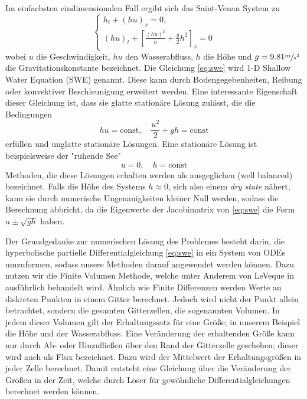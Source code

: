 Im einfachsten eindimensionalen Fall ergibt sich das Saint-Venan System zu 
\begin{equation}
\begin{cases}
 h_t + (hu)_x = 0,\\
 (hu)_t + \left[\frac{(hu)^2}{h} + \frac{g}{2}h^2\right]_x = 0
\end{cases} 
\label{eq:swe}
\end{equation}
wobei $u$ die Geschwindigkeit, $hu$ den Wasserabfluss, $h$ die Höhe und $g=9.81 \sfrac{m}{s^2}$ die Gravitationskonstante bezeichnet.
Die Gleichung \eqref{eq:swe} wird 1-D Shallow Water Equation (SWE) genannt.
Diese kann durch Bodengegebenheiten, Reibung oder konvektiver Beschleunigung erweitert werden.
Eine interessante Eigenschaft dieser Gleichung ist, dass sie glatte stationäre Lösung zulässt, die die Bedingungen
\[
 hu = \text{const}, \quad \frac{u^2}{2}+gh = \text{const}
\]
erfüllen und unglatte stationäre Lösungen. Eine stationäre Lösung ist beispielsweise der "ruhende See"
\[
 u=0, \quad h=\text{const}
\]
Methoden, die diese Lösungen erhalten werden als ausgeglichen (well balanced) bezeichnet. Falls die Höhe des Systems $h \approx 0 $, sich also einem \textit{dry state} nähert, kann sie durch numerische Ungenauigkeiten kleiner Null werden, sodass die Berechnung abbricht, da die Eigenwerte der Jacobimatrix von \eqref{eq:swe} die Form $u\pm \sqrt{gh}$ haben.

Der Grundgedanke zur numerischen Lösung des Problemes besteht darin, die hyperbolische partielle Differentialgleichung \eqref{eq:swe} in ein System von ODEs umzuformen, sodass unsere Methoden darauf angewendet werden können.
Dazu nutzen wir die Finite Volumen Methode, welche unter Anderem von LeVeque in \cite[Abschnitt 4.]{leveque2002finite} ausführlich behandelt wird. Ähnlich wie Finite Differenzen werden Werte an diskreten Punkten in einem Gitter berechnet. Jedoch wird nicht der Punkt allein betrachtet, sondern die gesamten Gitterzellen, die sogenannten Volumen. In jedem dieser Volumen gilt der Erhaltungssatz für eine Größe; in unserem Beispiel die Höhe und der Wasserabfluss. Eine Veränderung der erhaltenden Größe kann nur durch Ab- oder Hinzufließen über den Rand der Gitterzelle geschehen; dieser wird auch als Flux bezeichnet. Dazu wird der Mittelwert der Erhaltungsgrößen in jeder Zelle berechnet. Damit entsteht eine Gleichung über die Veränderung der Größen in der Zeit, welche durch Löser für gewöhnliche Differentialgleichungen berechnet werden können.


